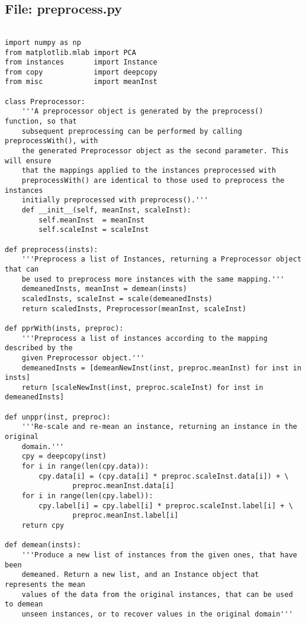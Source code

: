 \documentclass{article}
\begin{document}
\subsection*{File: preprocess.py}
\begin{verbatim}

import numpy as np
from matplotlib.mlab import PCA
from instances       import Instance
from copy            import deepcopy
from misc            import meanInst

class Preprocessor:
    '''A preprocessor object is generated by the preprocess() function, so that
    subsequent preprocessing can be performed by calling preprocessWith(), with
    the generated Preprocessor object as the second parameter. This will ensure
    that the mappings applied to the instances preprocessed with
    preprocessWith() are identical to those used to preprocess the instances
    initially preprocessed with preprocess().'''
    def __init__(self, meanInst, scaleInst):
        self.meanInst  = meanInst
        self.scaleInst = scaleInst

def preprocess(insts):
    '''Preprocess a list of Instances, returning a Preprocessor object that can
    be used to preprocess more instances with the same mapping.'''
    demeanedInsts, meanInst = demean(insts)
    scaledInsts, scaleInst = scale(demeanedInsts)
    return scaledInsts, Preprocessor(meanInst, scaleInst)

def pprWith(insts, preproc):
    '''Preprocess a list of instances according to the mapping described by the
    given Preprocessor object.'''
    demeanedInsts = [demeanNewInst(inst, preproc.meanInst) for inst in insts]
    return [scaleNewInst(inst, preproc.scaleInst) for inst in demeanedInsts]

def unppr(inst, preproc):
    '''Re-scale and re-mean an instance, returning an instance in the original
    domain.'''
    cpy = deepcopy(inst)
    for i in range(len(cpy.data)):
        cpy.data[i] = (cpy.data[i] * preproc.scaleInst.data[i]) + \
                preproc.meanInst.data[i]
    for i in range(len(cpy.label)): 
        cpy.label[i] = cpy.label[i] * preproc.scaleInst.label[i] + \
                preproc.meanInst.label[i]
    return cpy

def demean(insts):
    '''Produce a new list of instances from the given ones, that have been
    demeaned. Return a new list, and an Instance object that represents the mean
    values of the data from the original instances, that can be used to demean
    unseen instances, or to recover values in the original domain'''


\end{verbatim}
\end{document}
